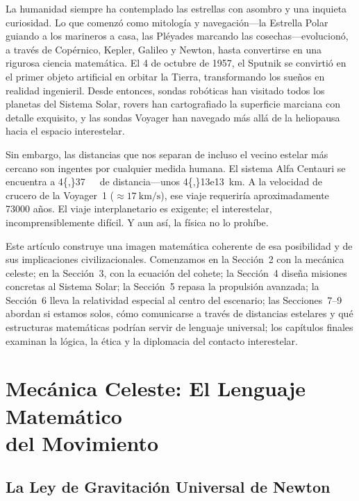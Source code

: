 \documentclass[12pt,a4paper]{article}
\newcommand{\ly}{\,\text{al}}
\begin{document}
La humanidad siempre ha contemplado las estrellas con asombro y una inquieta
curiosidad. Lo que comenzó como mitología y navegación---la Estrella Polar
guiando a los marineros a casa, las Pléyades marcando las cosechas---evolucionó,
a través de Copérnico, Kepler, Galileo y Newton, hasta convertirse en una
rigurosa ciencia matemática. El 4 de octubre de 1957, el Sputnik se convirtió
en el primer objeto artificial en orbitar la Tierra, transformando los sueños
en realidad ingenieril. Desde entonces, sondas robóticas han visitado todos
los planetas del Sistema Solar, rovers han cartografiado la superficie marciana
con detalle exquisito, y las sondas Voyager han navegado más allá de la
heliopausa hacia el espacio interestelar.

Sin embargo, las distancias que nos separan de incluso el vecino estelar más
cercano son ingentes por cualquier medida humana. El sistema Alfa Centauri se
encuentra a \SI{4{,}37}{\ly} de distancia---unos \SI{4{,}13e13}{\kilo\meter}.
A la velocidad de crucero de la Voyager~1 ($\approx \SI{17}{\kilo\meter\per\second}$),
ese viaje requeriría aproximadamente \num{73000} años. El viaje interplanetario
es exigente; el interestelar, incomprensiblemente difícil. Y aun así, la física
no lo prohíbe.

Este artículo construye una imagen matemática coherente de esa posibilidad y
de sus implicaciones civilizacionales. Comenzamos en la Sección~2 con la
mecánica celeste; en la Sección~3, con la ecuación del cohete; la Sección~4
diseña misiones concretas al Sistema Solar; la Sección~5 repasa la propulsión
avanzada; la Sección~6 lleva la relatividad especial al centro del escenario;
las Secciones~7--9 abordan si estamos solos, cómo comunicarse a través de
distancias estelares y qué estructuras matemáticas podrían servir de lenguaje
universal; los capítulos finales examinan la lógica, la ética y la diplomacia
del contacto interestelar.

\section[Mecánica Celeste: El Lenguaje Matemático del Movimiento]{Mecánica Celeste: El Lenguaje Matemático\\del Movimiento}

\subsection{La Ley de Gravitación Universal de Newton}
\end{document}
